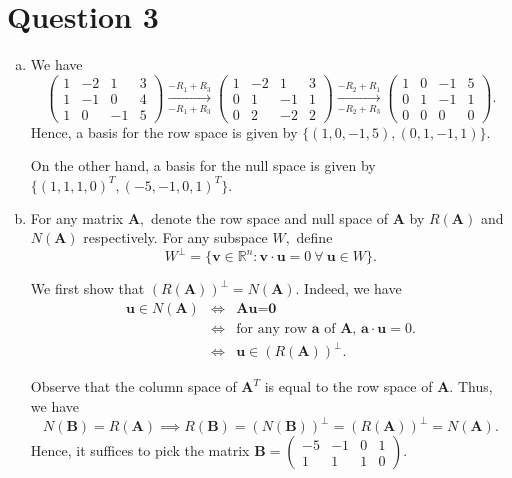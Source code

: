 \documentclass{article}
\begin{document}
\section*{Question 3}
\begin{enumerate}[(a)]
    \item We have
    $$
    \begin{pmatrix}
    1&-2&1&3\\1&-1&0&4\\1&0&-1&5
    \end{pmatrix}\xrightarrow[-R_1+R_3]{-R_1+R_3}
    \begin{pmatrix}
    1&-2&1&3\\0&1&-1&1\\0&2&-2&2
    \end{pmatrix}\xrightarrow[-R_2+R_3]{-R_2+R_1}
    \begin{pmatrix}
    1&0&-1&5\\0&1&-1&1\\0&0&0&0
    \end{pmatrix}.
    $$
    Hence, a basis for the row space is given by $\{(1,0,-1,5),(0,1,-1,1)\}.$
    
    On the other hand, a basis for the null space is given by $\{(1,1,1,0)^T, (-5,-1,0,1)^T\}.$
    \item For any matrix $\textbf{A},$ denote the row space and null space of $\textbf{A}$ by $R(\textbf{A})$ and $N(\textbf{A})$ respectively. For any subspace $W,$ define $$W^{\perp}=\{\textbf{v}\in\mathbb{R}^n:\textbf{v}\cdot\textbf{u}=0\ \forall\  \textbf{u}\in W\}.$$
    
    We first show that $(R(\textbf{A}))^{\perp}=N(\textbf{A}).$ Indeed, we have
    \begin{eqnarray*}
    \textbf{u}\in N(\textbf{A}) &\iff& \textbf{A}\textbf{u}=\textbf{0}\\
    &\iff& \text {for any row $\textbf{a}$ of $\textbf{A}$, $\textbf{a}\cdot\textbf{u}=0.$}\\
    &\iff& \textbf{u}\in (R(\textbf{A}))^{\perp}.
    \end{eqnarray*}
    
    Observe that the column space of $\textbf{A}^T$ is equal to the row space of $\textbf{A}.$ Thus, we have $$N(\textbf{B})=R(\textbf{A})\implies R(\textbf{B})=(N(\textbf{B}))^{\perp}=(R(\textbf{A}))^{\perp}=N(\textbf{A}).$$ Hence, it suffices to pick the matrix $\textbf{B}=\begin{pmatrix}-5&-1&0&1\\1&1&1&0\end{pmatrix}.$
    

\end{enumerate}
\end{document}
